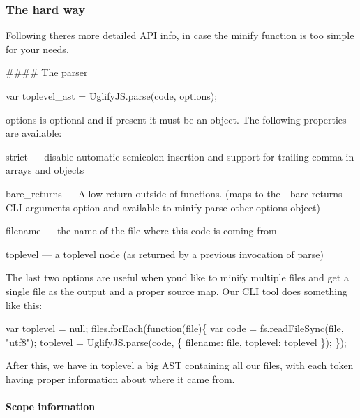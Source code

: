 \subsubsection*{The hard way}

Following there\textquotesingle{}s more detailed A\+PI info, in case the {\ttfamily minify} function is too simple for your needs.

\#\#\#\# The parser 
\begin{DoxyCode}
var toplevel\_ast = UglifyJS.parse(code, options);
\end{DoxyCode}


{\ttfamily options} is optional and if present it must be an object. The following properties are available\+:


\begin{DoxyItemize}
\item {\ttfamily strict} — disable automatic semicolon insertion and support for trailing comma in arrays and objects
\item {\ttfamily bare\+\_\+returns} — Allow return outside of functions. (maps to the {\ttfamily -\/-\/bare-\/returns} C\+LI arguments option and available to {\ttfamily minify} {\ttfamily parse} other options object)
\item {\ttfamily filename} — the name of the file where this code is coming from
\item {\ttfamily toplevel} — a {\ttfamily toplevel} node (as returned by a previous invocation of {\ttfamily parse})
\end{DoxyItemize}

The last two options are useful when you\textquotesingle{}d like to minify multiple files and get a single file as the output and a proper source map. Our C\+LI tool does something like this\+: 
\begin{DoxyCode}
var toplevel = null;
files.forEach(function(file)\{
    var code = fs.readFileSync(file, "utf8");
    toplevel = UglifyJS.parse(code, \{
        filename: file,
        toplevel: toplevel
    \});
\});
\end{DoxyCode}


After this, we have in {\ttfamily toplevel} a big A\+ST containing all our files, with each token having proper information about where it came from.

\paragraph*{Scope information}

